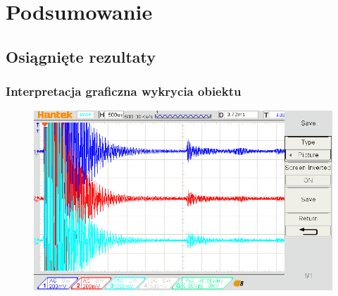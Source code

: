 \documentclass[xcolor=dvipsnames]{beamer}%
\begin{document}
\section{Podsumowanie}
\subsection{Osiągnięte rezultaty}
\begin{frame}
	\frametitle{Interpretacja graficzna wykrycia obiektu}
	\begin{figure}
		\includegraphics[width=\textwidth]{figure/dso_01_25_07_01_21.jpg}
	\end{figure}
\end{frame}
	
\end{document}
